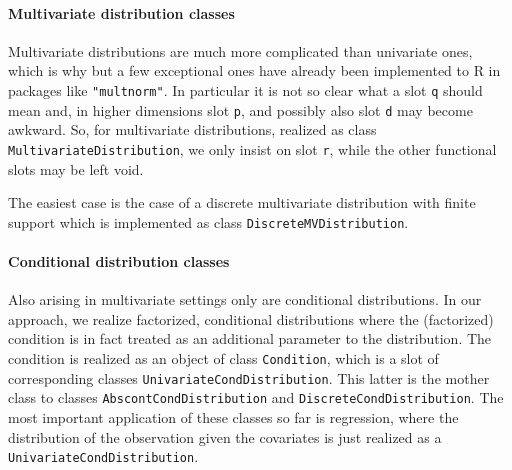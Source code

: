\documentclass[11pt]{article}
\newcommand{\code}[1]{{\tt #1}}
\newcommand{\pkg}[1]{{\tt "#1"}}
\begin{document}
\paragraph{Multivariate distribution classes}

Multivariate distributions are much more complicated than univariate ones,
which is why but a few exceptional ones have already been implemented to R in
packages like \pkg{multnorm}. In particular it is not so clear what a slot \code{q}
should mean and, in higher dimensions slot \code{p}, and possibly also slot \code{d}
may become awkward. So, for multivariate distributions, realized as class
\code{MultivariateDistribution}, we only insist on slot \code{r}, while the other
functional slots may be left void.

The easiest case is the case of a discrete multivariate distribution with finite support
which is implemented as class \code{DiscreteMVDistribution}.

\paragraph{Conditional distribution classes}

Also arising in multivariate settings only are conditional distributions. In our approach,
we realize factorized, conditional distributions where the (factorized) condition is in
fact treated as an additional parameter to the distribution. The condition is realized
as an object of class \code{Condition}, which is a slot of corresponding classes
\code{UnivariateCondDistribution}. This latter is the mother class to classes
\code{AbscontCondDistribution} and \code{DiscreteCondDistribution}.
The most important application of these classes so far is regression, where
the distribution of the observation given the covariates is just realized as
a \code{UnivariateCondDistribution}.
\end{document}
